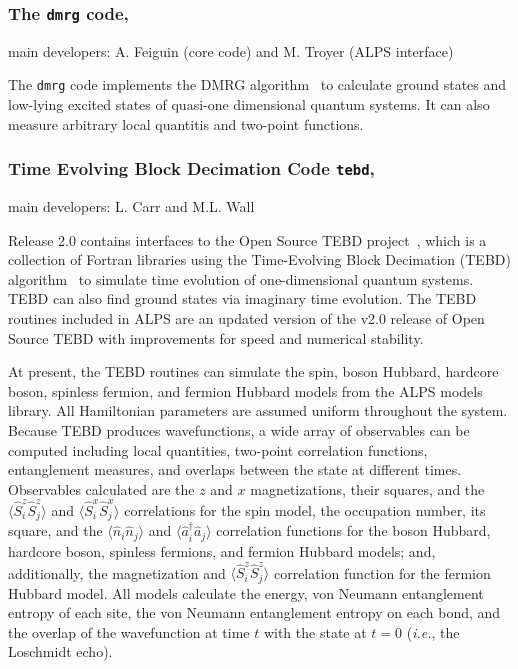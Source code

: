 \documentclass[12pt]{iopart}
\begin{document}
\subsubsection{The {\tt dmrg} code,} main developers: A. Feiguin (core code) and M. Troyer (ALPS interface)

\smallskip 

The {\tt dmrg} code implements the DMRG algorithm~\cite{White1992,Schollwock2005} to calculate ground states and low-lying excited states of quasi-one dimensional quantum systems. It can also measure arbitrary local quantitis and two-point functions.

\subsubsection{Time Evolving Block Decimation Code {\tt tebd},} main developers: L. Carr and M.L. Wall

\smallskip

Release 2.0 contains interfaces to the Open Source TEBD project~\cite{ostebd}, which is a collection of Fortran libraries using the Time-Evolving Block Decimation (TEBD) algorithm~\cite{vidal1, vidal2} to simulate time evolution of one-dimensional quantum systems. TEBD can also find ground states via imaginary time evolution. The TEBD routines included in ALPS are an updated version of the v2.0 release of Open Source TEBD with improvements for speed and numerical stability.

At present, the TEBD routines can simulate the spin, boson Hubbard, hardcore boson, spinless fermion, and fermion Hubbard models from the ALPS models library. All 
Hamiltonian parameters are assumed uniform throughout the system. Because TEBD produces wavefunctions, a wide array of observables can be computed including local quantities, two-point correlation functions, entanglement measures, and overlaps between the state at different times. Observables calculated are the $z$ and $x$ magnetizations, their squares, and the $\langle \hat{S}^z_i 
\hat{S}^z_j\rangle$ and $\langle \hat{S}^x_i \hat{S}^x_j\rangle$ correlations for the spin model, the occupation number, its square, and the $\langle \hat{n}_i \hat{n}_j\rangle$ and 
$\langle \hat{a}_i^{\dagger} \hat{a}_j\rangle$ correlation functions for the boson Hubbard, hardcore boson, spinless fermions, and fermion Hubbard models; and, additionally, 
the magnetization and $\langle \hat{S}^z_i \hat{S}^z_j\rangle$ correlation function for the fermion Hubbard model. All models calculate the energy, von Neumann entanglement 
entropy of each site, the von Neumann entanglement entropy on each bond, and the overlap of the wavefunction at time $t$ with the state at $t=0$ ({\it i.e.}, the Loschmidt echo).
\end{document}

